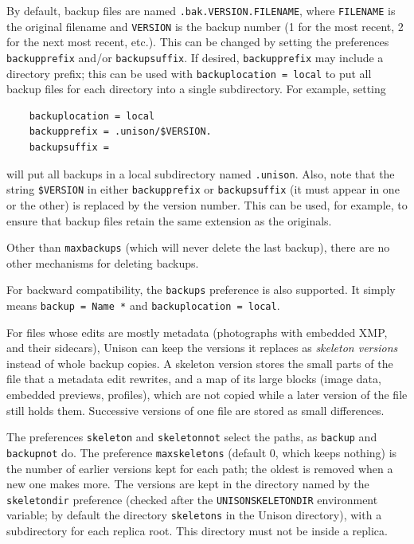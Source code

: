 \documentclass{article}
\begin{document}
By default, backup files are named \verb|.bak.VERSION.FILENAME|,
where \verb|FILENAME| is the original filename and \verb|VERSION| is the
backup number (1 for the most recent, 2 for the next most recent,
etc.).  This can be changed by setting the preferences \verb|backupprefix|
and/or \verb|backupsuffix|.  If desired, \verb|backupprefix| may include a
directory prefix; this can be used with \verb|backuplocation = local| to put all
backup files for each directory into a single subdirectory.  For example, setting
\begin{verbatim}
    backuplocation = local
    backupprefix = .unison/$VERSION.
    backupsuffix =
\end{verbatim}
will put all backups in a local subdirectory named \verb|.unison|.  Also,
note that the string \verb|$VERSION| in either \verb|backupprefix| or
\verb|backupsuffix| (it must appear in one or the other) is replaced by
the version number.  This can be used, for example, to ensure that backup
files retain the same extension as the originals.

Other than \verb|maxbackups| (which will never delete the last
backup), there are no other mechanisms for deleting backups.

For backward compatibility, the \verb|backups| preference is also supported.
%
It simply means \verb|backup = Name *| and \verb|backuplocation = local|.



For files whose edits are mostly metadata (photographs with embedded XMP,
and their sidecars), Unison can keep the versions it replaces as
\emph{skeleton versions} instead of whole backup copies.  A skeleton version
stores the small parts of the file that a metadata edit rewrites, and a map
of its large blocks (image data, embedded previews, profiles), which are not
copied while a later version of the file still holds them.  Successive
versions of one file are stored as small differences.

The preferences \verb|skeleton| and \verb|skeletonnot| select the paths, as
\verb|backup| and \verb|backupnot| do.  The preference \verb|maxskeletons|
(default 0, which keeps nothing) is the number of earlier versions kept for
each path; the oldest is removed when a new one makes more.  The versions are
kept in the directory named by the \verb|skeletondir| preference (checked
after the \verb|UNISONSKELETONDIR| environment variable; by default the
directory \verb|skeletons| in the Unison directory), with a subdirectory for
each replica root.  This directory must not be inside a replica.
\end{document}
